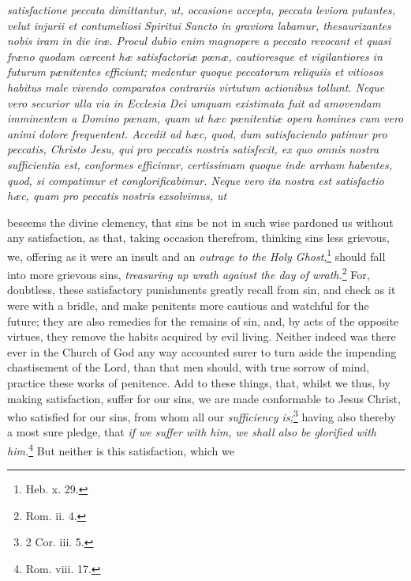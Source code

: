 \emph{satisfactione peccata dimittantur, ut, occasione accepta, peccata leviora putantes, velut injurii et contumeliosi Spiritui Sancto in graviora labamur, thesaurizantes nobis iram in die iræ. Procul dubio enim magnopere a peccato revocant et quasi fræno quodam cærcent hæ satisfactoriæ pœnæ, cautioresque et vigilantiores in futurum pænitentes efficiunt; medentur quoque peccatorum reliquiis et vitiosos habitus male vivendo comparatos contrariis virtutum actionibus tollunt. Neque vero securior ulla via in Ecclesia Dei umquam existimata fuit ad amovendam imminentem a Domino pœnam, quam ut hæc pœnitentiæ opera homines cum vero animi dolore frequentent. Accedit ad hæc, quod, dum satisfaciendo patimur pro peccatis, Christo Jesu, qui pro peccatis nostris satisfecit, ex quo omnis nostra sufficientia est, conformes efficimur, certissimam quoque inde arrham habentes, quod, si compatimur et conglorificabimur. Neque vero ita nostra est satisfactio hæc, quam pro peccatis nostris exsolvimus, ut }

beseems the divine clemency, that sins be not in such wise pardoned us without any satisfaction, as that, taking occasion therefrom, thinking sins less grievous, we, offering as it were an insult and an \emph{outrage to the Holy Ghost},\footnote{\par   Heb. x. 29.} should fall into more grievous sins, \emph{treasuring up wrath against the day of wrath.}\footnote{\par   Rom. ii. 4.} For, doubtless, these satisfactory punishments greatly recall from sin, and check as it were with a bridle, and make penitents more cautious and watchful for the future; they are also remedies for the remains of sin, and, by acts of the opposite virtues, they remove the habits acquired by evil living. Neither indeed was there ever in the Church of God any way accounted surer to turn aside the impending chastisement of the Lord, than that men should, with true sorrow of mind, practice these works of penitence. Add to these things, that, whilst we thus, by making satisfaction, suffer for our sins, we are made conformable to Jesus Christ, who satisfied for our sins, from whom all our \emph{sufficiency is;}\footnote{\par   2 Cor. iii. 5.} having also thereby a most sure pledge, that \emph{if we suffer with him, we shall also be glorified with him.}\footnote{\par   Rom. viii. 17.} But neither is this satisfaction, which we

